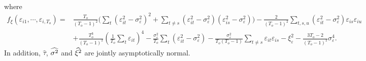 \begin{lemma}
\begin{align*}
\end{align*}
where 
\begin{align*}
    f_\xi(\varepsilon_{i1}, \cdots, \varepsilon_{i,T_o}) =&  \frac{T_o}{(T_o - 1)^2}   \Big( \sum_{t} ( \varepsilon_{it}^2 - \sigma^2_\varepsilon)^2  + \sum_{t\neq s} ( \varepsilon_{it}^2 - \sigma^2_\varepsilon) ( \varepsilon_{is}^2 - \sigma^2_\varepsilon) \Big)  - \frac{2}{(T_o - 1)^2}  \sum_{t,s,u} ( \varepsilon_{it}^2 - \sigma^2_\varepsilon) \varepsilon_{is} \varepsilon_{iu}  \\
    &+ \frac{T_o^3}{(T_o - 1)^2} \left(\frac{1}{T_o} \sum_t \varepsilon_{it} \right)^4  - \frac{\sigma_\varepsilon^2}{T_o} \sum_{t} (\varepsilon_{it}^2 - \sigma_\varepsilon^2 ) - \frac{\sigma_\varepsilon^2}{ T_o(T_o-1)} \sum_{t\neq s} \varepsilon_{it} \varepsilon_{is} - \xi_\varepsilon^2 -\frac{3T_o-2}{(T_o-1)^2} \sigma_\varepsilon^4.
\end{align*}
In addition, $\hat{\tau}$, $\widehat{\sigma^2}$ and $\widehat{\xi^2}$ are jointly asymptotically normal.
\end{lemma}

